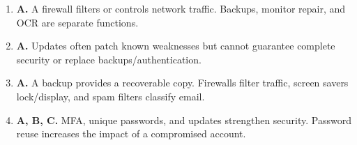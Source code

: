 \begin{enumerate}[label=\textbf{Q\arabic*.}, leftmargin=*]
\item \textbf{A.} A firewall filters or controls network traffic. Backups, monitor repair, and OCR are separate functions.

\item \textbf{A.} Updates often patch known weaknesses but cannot guarantee complete security or replace backups/authentication.

\item \textbf{A.} A backup provides a recoverable copy. Firewalls filter traffic, screen savers lock/display, and spam filters classify email.

\item \textbf{A, B, C.} MFA, unique passwords, and updates strengthen security. Password reuse increases the impact of a compromised account.

\end{enumerate}
